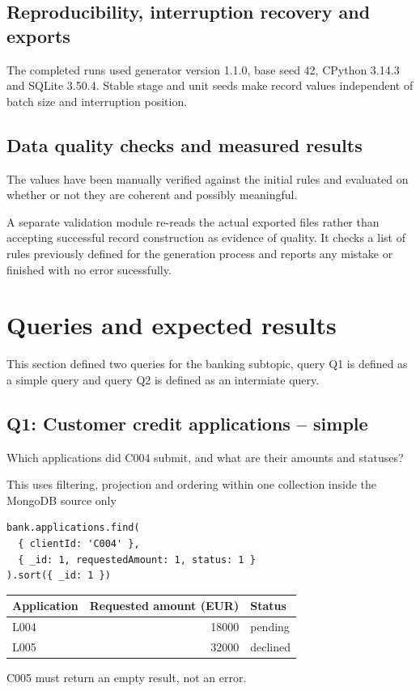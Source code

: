 \documentclass[11pt,a4paper]{article}
\begin{document}
\subsection{Reproducibility, interruption recovery and exports}

The completed runs used generator version 1.1.0, base seed 42, CPython 3.14.3
and SQLite 3.50.4. Stable stage and unit seeds make record values independent
of batch size and interruption position.

\subsection{Data quality checks and measured results}

The values have been manually verified against the initial rules and evaluated
on whether or not they are coherent and possibly meaningful.

A separate validation module re-reads the actual exported files rather than
accepting successful record construction as evidence of quality. It checks
a list of rules previously defined for the generation process and reports any mistake
or finished with no error sucessfully.

\section{Queries and expected results}
This section defined two queries for the banking subtopic, query Q1 is defined as
a simple query and query Q2 is defined as an intermiate query.

\subsection{Q1: Customer credit applications -- simple}
Which applications did C004 submit, and what are their amounts and statuses?

This uses filtering, projection and ordering within one collection inside the MongoDB source only

\begin{lstlisting}
bank.applications.find(
  { clientId: 'C004' },
  { _id: 1, requestedAmount: 1, status: 1 }
).sort({ _id: 1 })
\end{lstlisting}
\begin{center}
\begin{tabular}{l r l}
\toprule
Application & Requested amount (EUR) & Status\\\midrule
L004 & 18000 & pending\\
L005 & 32000 & declined\\\bottomrule
\end{tabular}
\end{center}
C005 must return an empty result, not an error.
\end{document}
